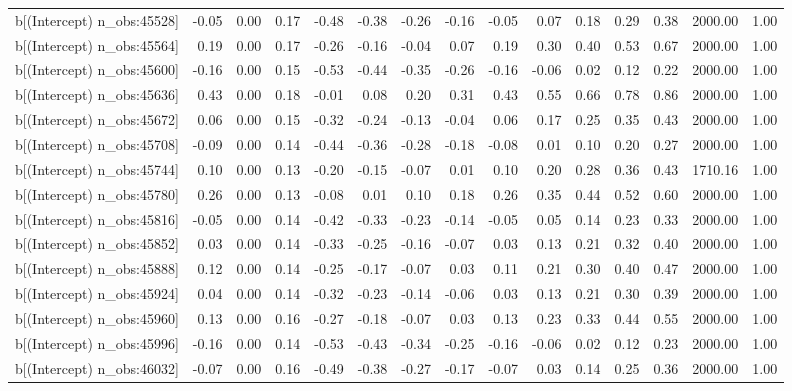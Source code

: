 \begin{table}[ht]
\begin{tabular}{rrrrrrrrrrrrrrr}
  b[(Intercept) n\_obs:45528] & -0.05 & 0.00 & 0.17 & -0.48 & -0.38 & -0.26 & -0.16 & -0.05 & 0.07 & 0.18 & 0.29 & 0.38 & 2000.00 & 1.00 \\ 
  b[(Intercept) n\_obs:45564] & 0.19 & 0.00 & 0.17 & -0.26 & -0.16 & -0.04 & 0.07 & 0.19 & 0.30 & 0.40 & 0.53 & 0.67 & 2000.00 & 1.00 \\ 
  b[(Intercept) n\_obs:45600] & -0.16 & 0.00 & 0.15 & -0.53 & -0.44 & -0.35 & -0.26 & -0.16 & -0.06 & 0.02 & 0.12 & 0.22 & 2000.00 & 1.00 \\ 
  b[(Intercept) n\_obs:45636] & 0.43 & 0.00 & 0.18 & -0.01 & 0.08 & 0.20 & 0.31 & 0.43 & 0.55 & 0.66 & 0.78 & 0.86 & 2000.00 & 1.00 \\ 
  b[(Intercept) n\_obs:45672] & 0.06 & 0.00 & 0.15 & -0.32 & -0.24 & -0.13 & -0.04 & 0.06 & 0.17 & 0.25 & 0.35 & 0.43 & 2000.00 & 1.00 \\ 
  b[(Intercept) n\_obs:45708] & -0.09 & 0.00 & 0.14 & -0.44 & -0.36 & -0.28 & -0.18 & -0.08 & 0.01 & 0.10 & 0.20 & 0.27 & 2000.00 & 1.00 \\ 
  b[(Intercept) n\_obs:45744] & 0.10 & 0.00 & 0.13 & -0.20 & -0.15 & -0.07 & 0.01 & 0.10 & 0.20 & 0.28 & 0.36 & 0.43 & 1710.16 & 1.00 \\ 
  b[(Intercept) n\_obs:45780] & 0.26 & 0.00 & 0.13 & -0.08 & 0.01 & 0.10 & 0.18 & 0.26 & 0.35 & 0.44 & 0.52 & 0.60 & 2000.00 & 1.00 \\ 
  b[(Intercept) n\_obs:45816] & -0.05 & 0.00 & 0.14 & -0.42 & -0.33 & -0.23 & -0.14 & -0.05 & 0.05 & 0.14 & 0.23 & 0.33 & 2000.00 & 1.00 \\ 
  b[(Intercept) n\_obs:45852] & 0.03 & 0.00 & 0.14 & -0.33 & -0.25 & -0.16 & -0.07 & 0.03 & 0.13 & 0.21 & 0.32 & 0.40 & 2000.00 & 1.00 \\ 
  b[(Intercept) n\_obs:45888] & 0.12 & 0.00 & 0.14 & -0.25 & -0.17 & -0.07 & 0.03 & 0.11 & 0.21 & 0.30 & 0.40 & 0.47 & 2000.00 & 1.00 \\ 
  b[(Intercept) n\_obs:45924] & 0.04 & 0.00 & 0.14 & -0.32 & -0.23 & -0.14 & -0.06 & 0.03 & 0.13 & 0.21 & 0.30 & 0.39 & 2000.00 & 1.00 \\ 
  b[(Intercept) n\_obs:45960] & 0.13 & 0.00 & 0.16 & -0.27 & -0.18 & -0.07 & 0.03 & 0.13 & 0.23 & 0.33 & 0.44 & 0.55 & 2000.00 & 1.00 \\ 
  b[(Intercept) n\_obs:45996] & -0.16 & 0.00 & 0.14 & -0.53 & -0.43 & -0.34 & -0.25 & -0.16 & -0.06 & 0.02 & 0.12 & 0.23 & 2000.00 & 1.00 \\ 
  b[(Intercept) n\_obs:46032] & -0.07 & 0.00 & 0.16 & -0.49 & -0.38 & -0.27 & -0.17 & -0.07 & 0.03 & 0.14 & 0.25 & 0.36 & 2000.00 & 1.00 \\ 

\end{tabular}
\end{table}
